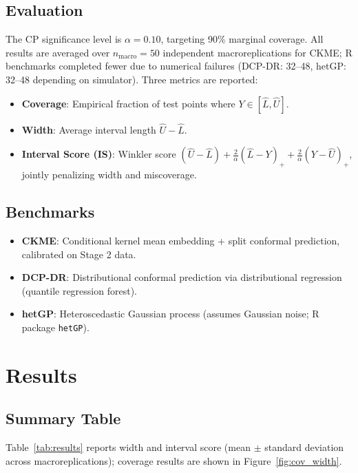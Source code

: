 \documentclass[11pt]{article}
\begin{document}
\subsection{Evaluation}

The CP significance level is $\alpha = 0.10$, targeting 90\% marginal coverage.
All results are averaged over $n_{\mathrm{macro}} = 50$ independent macroreplications for CKME; R benchmarks completed fewer due to numerical failures (DCP-DR: 32--48, hetGP: 32--48 depending on simulator).
Three metrics are reported:

\begin{itemize}
  \item \textbf{Coverage}: Empirical fraction of test points where $Y \in [\hat{L}, \hat{U}]$.
  \item \textbf{Width}: Average interval length $\hat{U} - \hat{L}$.
  \item \textbf{Interval Score (IS)}: Winkler score
  $(\hat{U}-\hat{L}) + \tfrac{2}{\alpha}(\hat{L}-Y)_+ + \tfrac{2}{\alpha}(Y-\hat{U})_+$,
  jointly penalizing width and miscoverage.
\end{itemize}

\subsection{Benchmarks}

\begin{itemize}
  \item \textbf{CKME}: Conditional kernel mean embedding + split conformal prediction, calibrated on Stage 2 data.
  \item \textbf{DCP-DR}: Distributional conformal prediction via distributional regression (quantile regression forest).
  \item \textbf{hetGP}: Heteroscedastic Gaussian process (assumes Gaussian noise; R package \texttt{hetGP}).
\end{itemize}

\clearpage
\section{Results}

\subsection{Summary Table}

Table~\ref{tab:results} reports width and interval score (mean $\pm$ standard deviation across macroreplications); coverage results are shown in Figure~\ref{fig:cov_width}.
\end{document}
